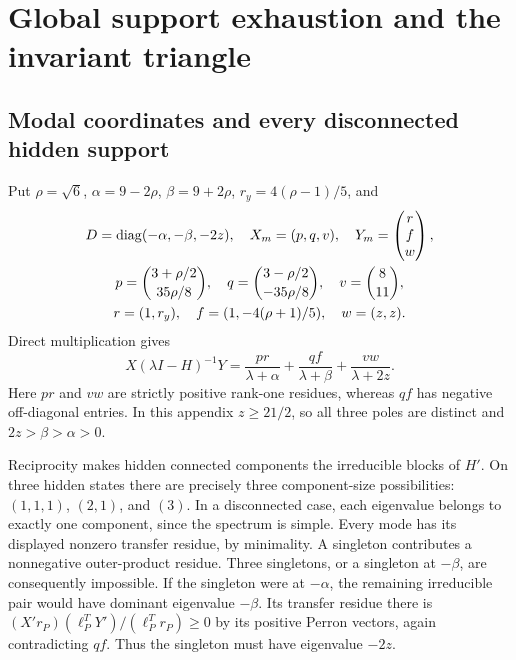 \section{Global support exhaustion and the invariant triangle}\label{app:cone}
\subsection{Modal coordinates and every disconnected hidden support}
Put $\rho=\sqrt6$, $\alpha=9-2\rho$, $\beta=9+2\rho$,
$r_y=4(\rho-1)/5$, and
\begin{gather}
 D=\operatorname{diag}(-\alpha,-\beta,-2z),\quad X_m=(p,q,v),\quad
 Y_m=\begin{pmatrix}r\\f\\w\end{pmatrix},\label{eq:modal}\\
 p=\binom{3+\rho/2}{35\rho/8},\quad
 q=\binom{3-\rho/2}{-35\rho/8},\quad v=\binom8{11},\\
 r=(1,r_y),\quad f=(1,-4(\rho+1)/5),\quad w=(z,z).
\end{gather}
Direct multiplication gives
\begin{equation}
 X(\lambda I-H)^{-1}Y
 =\frac{pr}{\lambda+\alpha}+\frac{qf}{\lambda+\beta}
  +\frac{vw}{\lambda+2z}.\label{eq:residues}
\end{equation}
Here $pr$ and $vw$ are strictly positive rank-one residues, whereas $qf$
has negative off-diagonal entries. In this appendix $z\ge21/2$, so all
three poles are distinct and $2z>\beta>\alpha>0$.

Reciprocity makes hidden connected components the irreducible blocks of
$H'$. On three hidden states there are precisely three component-size
possibilities: $(1,1,1)$, $(2,1)$, and $(3)$. In a disconnected case,
each eigenvalue belongs to exactly one component, since the spectrum is
simple. Every mode has its displayed nonzero transfer residue, by
minimality. A singleton contributes a nonnegative outer-product residue.
Three singletons, or a singleton at $-\beta$, are consequently impossible.
If the singleton were at $-\alpha$, the remaining irreducible pair would
have dominant eigenvalue $-\beta$. Its transfer residue there is
$(X'r_P)(\ell_P^TY')/(\ell_P^Tr_P)\ge0$ by its positive Perron vectors,
again contradicting $qf$. Thus the singleton must have eigenvalue $-2z$.

